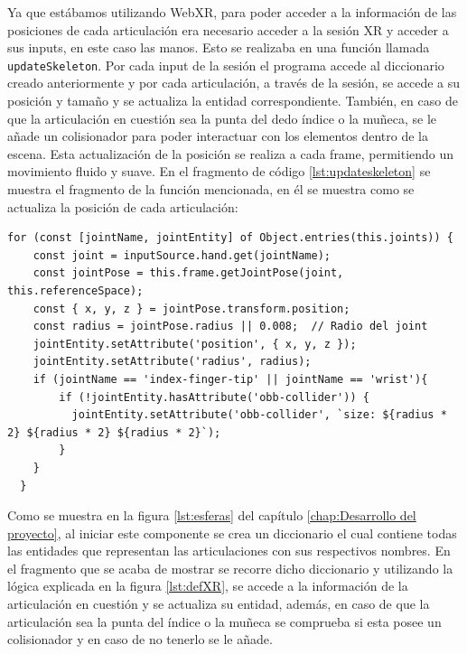 \documentclass[a4paper, 12pt]{book}
\begin{document}
Ya que estábamos utilizando WebXR, para poder acceder a la información de las posiciones de cada articulación era necesario acceder a la sesión XR y acceder a sus inputs, en este caso las manos. Esto se realizaba en una función llamada \texttt{updateSkeleton}. Por cada input de la sesión el programa accede al diccionario creado anteriormente y por cada articulación, a través de la sesión, se accede a su posición y tamaño y se actualiza la entidad correspondiente. También, en caso de que la articulación en cuestión sea la punta del dedo índice o la muñeca, se le añade un colisionador para 
poder interactuar con los elementos dentro de la escena. Esta actualización de la posición se realiza a cada frame, permitiendo un movimiento fluido y suave. En el fragmento de código \ref{lst:updateskeleton} se muestra el fragmento de la función mencionada, en él se muestra como se actualiza la posición de cada articulación: 

\begin{lstlisting}[caption=Actualización de las manos en la escena, captionpos=b, label=lst:updateskeleton]
  for (const [jointName, jointEntity] of Object.entries(this.joints)) {
    const joint = inputSource.hand.get(jointName);
    const jointPose = this.frame.getJointPose(joint, this.referenceSpace);
    const { x, y, z } = jointPose.transform.position;
    const radius = jointPose.radius || 0.008;  // Radio del joint
    jointEntity.setAttribute('position', { x, y, z });
    jointEntity.setAttribute('radius', radius);
    if (jointName == 'index-finger-tip' || jointName == 'wrist'){
        if (!jointEntity.hasAttribute('obb-collider')) {
          jointEntity.setAttribute('obb-collider', `size: ${radius * 2} ${radius * 2} ${radius * 2}`);
        }
    }
  }
\end{lstlisting}

Como se muestra en la figura \ref{lst:esferas} del capítulo \ref{chap:Desarrollo del proyecto}, al iniciar este componente se crea un diccionario el cual contiene todas las entidades que representan las articulaciones con sus respectivos nombres. En el fragmento que se acaba de mostrar se recorre dicho diccionario y utilizando la lógica explicada en la figura \ref{lst:defXR}, se accede a la información de la articulación en cuestión y se actualiza su entidad, además, en caso de que la articulación sea la punta del índice o la muñeca se comprueba si esta posee un colisionador y en caso de no tenerlo se le añade.
\end{document}
